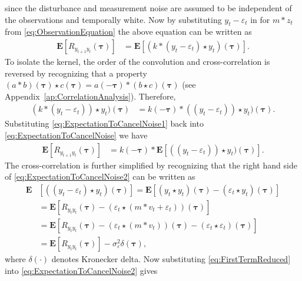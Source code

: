 \documentclass[10pt,twocolumn,twoside]{IEEEtran}
\begin{document}
since the disturbance and measurement noise are assumed to be independent of the observations and temporally white. Now by substituting $y_t - \varepsilon_t$   in for $m\ast z_t$ from \eqref{eq:ObservationEquation} the above equation can be written as
 \begin{align}\label{eq:ExpectationToCancelNoise}
	\mathbf{E}[R_{y_{t+1}y_t}(\boldsymbol{\tau})] &= \mathbf{E} [\left( k\ast (y_t - \varepsilon_t)\star y_t \right)(\boldsymbol{\tau}) ].
\end{align}
To isolate the kernel, the order of the convolution and cross-correlation is reversed by recognizing that a property $(a \ast b)(\boldsymbol\tau) \star c(\boldsymbol\tau) = a(-\boldsymbol\tau)\ast(b \star c)(\boldsymbol\tau)$ (see Appendix~\ref{ap:CorrelationAnalysis}). Therefore,
\begin{align}\label{eq:ExpectationToCancelNoise1}
 (k \ast (y_t - \varepsilon_t)) \star y_t)(\boldsymbol\tau) &= k(-\boldsymbol\tau) \ast ((y_t - \varepsilon_t)) \star y_t)(\boldsymbol\tau).
\end{align}  
Substituting \eqref{eq:ExpectationToCancelNoise1} back into \eqref{eq:ExpectationToCancelNoise} we have
\begin{align}\label{eq:ExpectationToCancelNoise2}
	\mathbf{E}[R_{y_{t+1}y_t}(\boldsymbol{\tau})] &= k(-\boldsymbol\tau) \ast \mathbf{E} [((y_t - \varepsilon_t)) \star y_t)(\boldsymbol\tau)].
\end{align} 
The cross-correlation is further simplified by recognizing that the right hand side of \eqref{eq:ExpectationToCancelNoise2} can be written as 
\begin{align}\label{eq:FirstTermReduced}  
	\mathbf{E}&\left[\left(\left(y_t-\varepsilon_t\right) \star y_t \right)(\boldsymbol{\tau})\right] = \mathbf{E}\left[ (y_t \star y_t)(\boldsymbol{\tau}) - \left(\varepsilon_t\star y_t \right)(\boldsymbol{\tau})\right] \nonumber \\
	&=\mathbf{E}[ R_{y_ty_t}(\boldsymbol{\tau})  - \left(\varepsilon_t \star (m\ast v_t + \varepsilon_t)\right) (\boldsymbol{\tau})] \nonumber\\
	&=\mathbf{E}[ R_{y_ty_t}(\boldsymbol{\tau}) -\left(\varepsilon_t\star (m\ast v_t)\right)(\boldsymbol{\tau}) - (\varepsilon_t\star\varepsilon_t)(\boldsymbol{\tau})]\nonumber \\
	&=\mathbf{E}[ R_{y_ty_t}(\boldsymbol{\tau})] - \sigma_{\varepsilon}^2 \delta(\boldsymbol{\tau}), 
\end{align}
where $\delta\left(\cdot\right)$ denotes Kronecker delta. Now substituting \eqref{eq:FirstTermReduced} into \eqref{eq:ExpectationToCancelNoise2} gives
\end{document}

